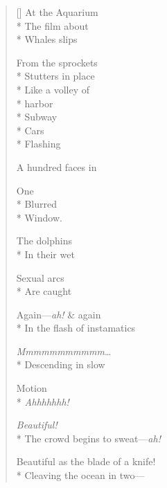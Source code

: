 \label{ch:later}
\settowidth{\versewidth}{Beautiful as the blade of a knife!}
\begin{verse}[\versewidth]
At the Aquarium\\*
The film about\\*
Whales slips

From the sprockets\\*
Stutters in place\\*
Like a volley of\\*
harbor\\*
Subway\\*
Cars\\*
Flashing

A hundred faces in

One\\*
Blurred\\*
Window.

The dolphins\\*
In their wet

Sexual arcs\\*
Are caught

Again---\textit{ah!} \& again\\*
In the flash of instamatics

\textit{Mmmmmmmmmmm}\ldots\\*
Descending in slow

Motion\\*
\textit{Ahhhhhhh!}

\textit{Beautiful!}\\*
The crowd begins to sweat---\textit{ah!}

Beautiful as the blade of a knife!\\*
Cleaving the ocean in two---
\end{verse}
